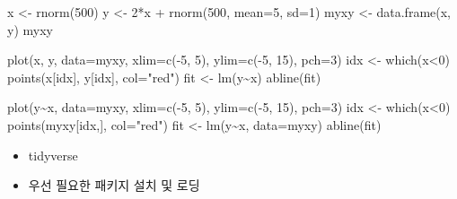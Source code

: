 \documentclass[
]{book}
\newenvironment{Shaded}{\begin{snugshade}}{\end{snugshade}}
\newcommand{\AttributeTok}[1]{\textcolor[rgb]{0.77,0.63,0.00}{#1}}
\newcommand{\DecValTok}[1]{\textcolor[rgb]{0.00,0.00,0.81}{#1}}
\newcommand{\FunctionTok}[1]{\textcolor[rgb]{0.00,0.00,0.00}{#1}}
\newcommand{\NormalTok}[1]{#1}
\newcommand{\OtherTok}[1]{\textcolor[rgb]{0.56,0.35,0.01}{#1}}
\newcommand{\SpecialCharTok}[1]{\textcolor[rgb]{0.00,0.00,0.00}{#1}}
\newcommand{\StringTok}[1]{\textcolor[rgb]{0.31,0.60,0.02}{#1}}
\providecommand{\tightlist}{%
  \setlength{\itemsep}{0pt}\setlength{\parskip}{0pt}}
\begin{document}
\begin{Shaded}
\begin{Highlighting}[]
\NormalTok{x }\OtherTok{\textless{}{-}} \FunctionTok{rnorm}\NormalTok{(}\DecValTok{500}\NormalTok{)}
\NormalTok{y }\OtherTok{\textless{}{-}} \DecValTok{2}\SpecialCharTok{*}\NormalTok{x }\SpecialCharTok{+} \FunctionTok{rnorm}\NormalTok{(}\DecValTok{500}\NormalTok{, }\AttributeTok{mean=}\DecValTok{5}\NormalTok{, }\AttributeTok{sd=}\DecValTok{1}\NormalTok{)}
\NormalTok{myxy }\OtherTok{\textless{}{-}} \FunctionTok{data.frame}\NormalTok{(x, y)}
\NormalTok{myxy}

\FunctionTok{plot}\NormalTok{(x, y, }\AttributeTok{data=}\NormalTok{myxy, }\AttributeTok{xlim=}\FunctionTok{c}\NormalTok{(}\SpecialCharTok{{-}}\DecValTok{5}\NormalTok{, }\DecValTok{5}\NormalTok{), }\AttributeTok{ylim=}\FunctionTok{c}\NormalTok{(}\SpecialCharTok{{-}}\DecValTok{5}\NormalTok{, }\DecValTok{15}\NormalTok{), }\AttributeTok{pch=}\DecValTok{3}\NormalTok{)}
\NormalTok{idx }\OtherTok{\textless{}{-}} \FunctionTok{which}\NormalTok{(x}\SpecialCharTok{\textless{}}\DecValTok{0}\NormalTok{)}
\FunctionTok{points}\NormalTok{(x[idx], y[idx], }\AttributeTok{col=}\StringTok{"red"}\NormalTok{)}
\NormalTok{fit }\OtherTok{\textless{}{-}} \FunctionTok{lm}\NormalTok{(y}\SpecialCharTok{\textasciitilde{}}\NormalTok{x)}
\FunctionTok{abline}\NormalTok{(fit)}


\FunctionTok{plot}\NormalTok{(y}\SpecialCharTok{\textasciitilde{}}\NormalTok{x, }\AttributeTok{data=}\NormalTok{myxy, }\AttributeTok{xlim=}\FunctionTok{c}\NormalTok{(}\SpecialCharTok{{-}}\DecValTok{5}\NormalTok{, }\DecValTok{5}\NormalTok{), }\AttributeTok{ylim=}\FunctionTok{c}\NormalTok{(}\SpecialCharTok{{-}}\DecValTok{5}\NormalTok{, }\DecValTok{15}\NormalTok{), }\AttributeTok{pch=}\DecValTok{3}\NormalTok{)}
\NormalTok{idx }\OtherTok{\textless{}{-}} \FunctionTok{which}\NormalTok{(x}\SpecialCharTok{\textless{}}\DecValTok{0}\NormalTok{)}
\FunctionTok{points}\NormalTok{(myxy[idx,], }\AttributeTok{col=}\StringTok{"red"}\NormalTok{)}
\NormalTok{fit }\OtherTok{\textless{}{-}} \FunctionTok{lm}\NormalTok{(y}\SpecialCharTok{\textasciitilde{}}\NormalTok{x, }\AttributeTok{data=}\NormalTok{myxy)}
\FunctionTok{abline}\NormalTok{(fit)}
\end{Highlighting}
\end{Shaded}

\begin{itemize}
\tightlist
\item
  tidyverse
\item
  우선 필요한 패키지 설치 및 로딩
\end{itemize}
\end{document}
